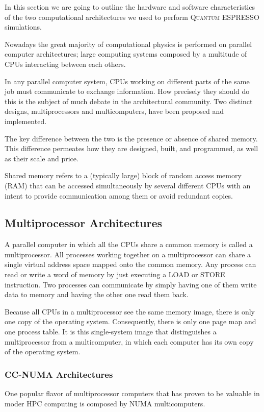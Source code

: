 \documentclass[a4paper,12pt]{article}
\newcommand\QE{\textsc{Quantum} ESPRESSO }
\begin{document}
In this section we are going to outline the hardware and software characteristics of the two computational architectures we used to perform \QE simulations.

Nowadays the great majority of computational physics is performed on parallel computer architectures; 
large computing systems composed by a multitude of CPUs interacting between each others.

In any parallel computer system, CPUs working on different parts of the same job must communicate to exchange information. How precisely they should do this is the subject of much debate in the architectural community. 
Two distinct designs, multiprocessors and multicomputers, have been proposed and implemented.

The key difference between the two is the presence or absence of shared memory.
This difference permeates how they are designed, built, and programmed, as well as their scale and price\cite[p.586]{Tanenbaum}.

Shared memory refers to a (typically large) block of random access memory (RAM) that can be accessed simultaneously by several different CPUs with an intent to provide communication among them or avoid redundant copies.


\subsection{Multiprocessor Architectures}\label{sec:multiprocessor}
A parallel computer in which all the CPUs share a common memory is called a multiprocessor. 
All processes working together on a multiprocessor can share a single virtual address space mapped onto the common memory. 
Any process can read or write a word of memory by just executing a LOAD or STORE instruction.
Two processes can communicate by simply having one of them write data to memory and having the other one read them back.

Because all CPUs in a multiprocessor see the same memory image, there is only one copy of the operating system. 
Consequently, there is only one page map and one process table. 
It is this single-system image that distinguishes a multiprocessor from a multicomputer, in which each computer has its own copy of the operating system.

\subsubsection{CC-NUMA Architectures}
One popular flavor of multiprocessor computers that has proven to be valuable in moder HPC computing is composed by NUMA multicomputers.
\end{document}

